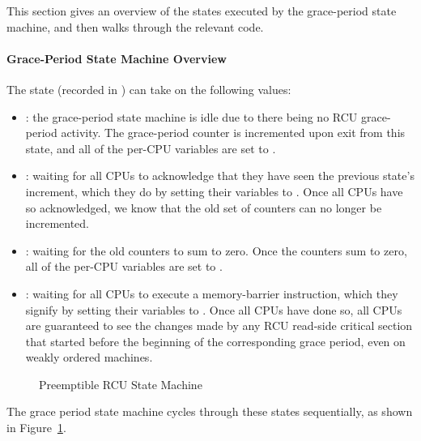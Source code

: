 This section gives an overview of the states executed by the grace-period
state machine, and then walks through the relevant code.

\paragraph{Grace-Period State Machine Overview}
\label{app:rcuimpl:Grace-Period State Machine Overview}

The state (recorded in )
can take on the following values:

\begin{itemize}
\item	{}:  the grace-period state
	machine is idle due to there being no RCU grace-period activity.
	The  grace-period counter
	is incremented upon exit from this state, and all of the
	per-CPU  variables are set
	to .
\item	{}:
	waiting for all CPUs to acknowledge that they have seen the
	previous state's increment, which they do by setting their
	 variables to .
	Once all CPUs have so acknowledged, we know that the old
	set of counters can no longer be incremented.
\item	{}:
	waiting for the old counters to sum to zero.
	Once the counters sum to zero, all of the per-CPU
	 variables are set to
	.
\item	{}:
	waiting for all CPUs to execute a memory-barrier instruction,
	which they signify by setting their 
	variables to .
	Once all CPUs have done so, all CPUs are guaranteed to see
	the changes made by any RCU read-side critical section that
	started before the beginning of the corresponding grace period,
	even on weakly ordered machines.
\end{itemize}

\begin{figure}[htb]
\centering
{}
\caption{Preemptible RCU State Machine}
\label{app:rcuimpl:Preemptible RCU State Machine}
\end{figure}

The grace period state machine cycles through these states sequentially,
as shown in
Figure~\ref{app:rcuimpl:Preemptible RCU State Machine}.

